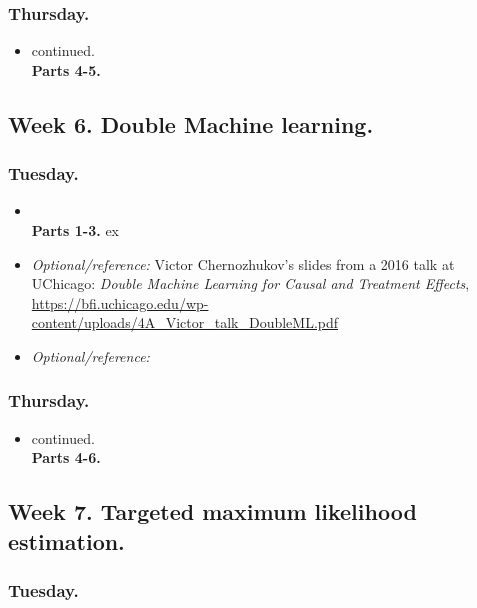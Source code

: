 \documentclass[letterpaper, 12pt, parskip=full,DIV=10]{scrartcl}
\begin{document}
\subsubsection*{Thursday.}
\begin{itemize}
\item \cite{kennedy2022semiparametric} continued. \\
\textbf{Parts 4-5.}
\end{itemize}

\subsection*{Week 6. Double Machine learning.}

\subsubsection*{Tuesday.}
\begin{itemize}
\item {} \\
\textbf{Parts 1-3.} ex
\item  \textit{Optional/reference:} Victor Chernozhukov's slides from a 2016 talk at UChicago: \emph{Double Machine Learning for Causal and Treatment Effects}, \url{https://bfi.uchicago.edu/wp-content/uploads/4A_Victor_talk_DoubleML.pdf}
\item  \textit{Optional/reference:} 
\end{itemize}


\subsubsection*{Thursday.}
\begin{itemize}
\item \cite{chernozhukov2018double} continued.  \\
\textbf{Parts 4-6.}%
\end{itemize}



\subsection*{Week 7. Targeted maximum likelihood estimation.}
\subsubsection*{Tuesday.}
\end{document}
